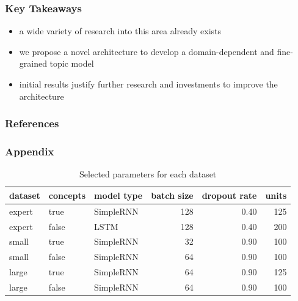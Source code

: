 \documentclass[aspectratio=169]{beamer}
\begin{document}
\begin{frame} \frametitle{Key Takeaways}

\begin{itemize}
    \item a wide variety of research into this area already exists \pause
    \item we propose a novel architecture to develop a domain-dependent and fine-grained topic model \pause
    \item initial results justify further research and investments to improve the architecture
\end{itemize}

\end{frame}






\begin{frame}[allowframebreaks]
\frametitle{References}
    \printbibliography
\end{frame}

\begin{frame} \frametitle{Appendix}

\begin{table}[h]
\centering
\caption{Selected parameters for each dataset}
\label{table:phase-2-results-a}
\begin{tabular}{lllrrr}
\toprule
dataset & concepts & model type & batch size & dropout rate & units \\
\midrule
expert & true & SimpleRNN & 128 & 0.40 & 125 \\
expert & false & LSTM & 128 & 0.40 & 200 \\
small & true & SimpleRNN & 32 & 0.90 & 100 \\
small & false & SimpleRNN & 64 & 0.90 & 100 \\
large & true & SimpleRNN & 64 & 0.90 & 125 \\
large & false & SimpleRNN & 64 & 0.90 & 100 \\
\bottomrule
\end{tabular}
\end{table}



\end{frame}

\end{document}
